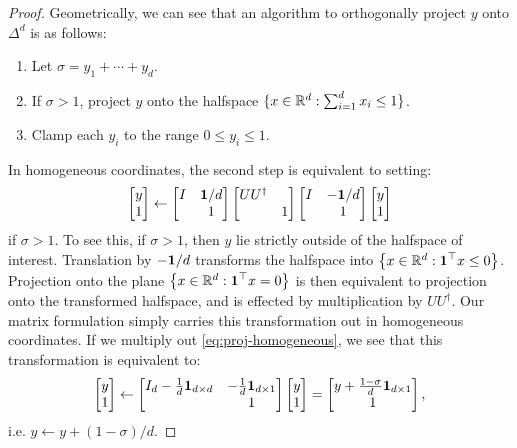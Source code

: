 \documentclass[eikonal.tex]{subfiles}
\begin{document}
\begin{proof}
  Geometrically, we can see that an algorithm to orthogonally project
  $y$ onto $\Delta^d$ is as follows:
  \begin{enumerate}
  \item Let $\sigma = y_1 + \cdots + y_d$.
  \item If $\sigma > 1$, project $y$ onto the halfspace
    $\{x \in \mathbb{R}^d : \sum_{i=1}^d x_i \leq 1\}$.
  \item Clamp each $y_i$ to the range $0 \leq y_i \leq 1$.
  \end{enumerate}
  In homogeneous coordinates, the second step is equivalent to setting:
  \begin{align}\label{eq:proj-homogeneous}
    \begin{bmatrix}
      y \\ 1
    \end{bmatrix} \gets \begin{bmatrix}
      I & \boldsymbol{1}/d \\ & 1
    \end{bmatrix} \begin{bmatrix}
      UU^\dagger & \\
      & 1
    \end{bmatrix} \begin{bmatrix}
      I & -\boldsymbol{1}/d \\ & 1
    \end{bmatrix} \begin{bmatrix}
      y \\ 1
    \end{bmatrix}
  \end{align}
  if $\sigma > 1$. To see this, if $\sigma > 1$, then $y$ lie strictly
  outside of the halfspace of interest. Translation by $-\boldsymbol{1}/d$
  transforms the halfspace into
  $\left\{x \in \mathbb{R}^d : \boldsymbol{1}^\top x \leq 0\right\}$. Projection onto the plane
  $\left\{x \in \mathbb{R}^d : \boldsymbol{1}^\top x = 0\right\}$ is then equivalent to
  projection onto the transformed halfspace, and is effected by
  multiplication by $UU^\dagger$. Our matrix formulation simply
  carries this transformation out in homogeneous coordinates. If we
  multiply out \cref{eq:proj-homogeneous}, we see that this
  transformation is equivalent to:
  \begin{align*}
    \begin{bmatrix}
      y \\ 1
    \end{bmatrix} \gets \begin{bmatrix}
      I_d - \tfrac{1}{d} \boldsymbol{1}_{d \times d} & -\tfrac{1}{d} \boldsymbol{1}_{d \times 1} \\
      & 1
    \end{bmatrix} \begin{bmatrix}
      y \\ 1
    \end{bmatrix} = \begin{bmatrix}
      y + \frac{1 - \sigma}{d} \boldsymbol{1}_{d \times 1} \\
      1
    \end{bmatrix},
  \end{align*}
  i.e. $y \gets y + (1 - \sigma)/d$.
\end{proof}
\end{document}
